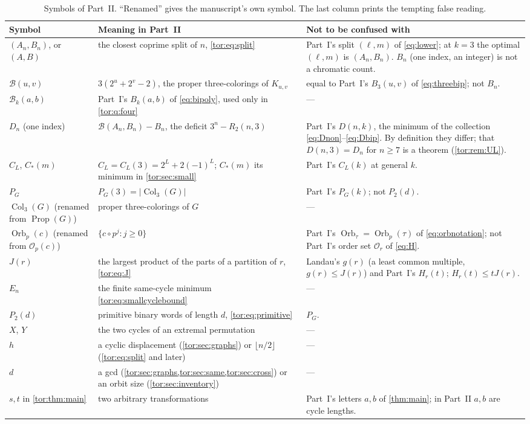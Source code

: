 \documentclass[11pt,a4paper]{article}
\numberwithin{equation}{section}
\theoremstyle{definition}
\theoremstyle{remark}
\newcommand{\Orb}{\operatorname{Orb}}
\newcommand{\Bip}{\mathcal B}
\begin{document}
\begin{table}[htbp]
\centering\small
\caption{Symbols of Part~II. ``Renamed'' gives the manuscript's own symbol.
The last column prints the tempting false reading.}
\label{tor:tab:notation}
\begin{tabular}{>{\raggedright}p{.20\linewidth}>{\raggedright}p{.36\linewidth}>{\raggedright\arraybackslash}p{.36\linewidth}}
\toprule
Symbol & Meaning in Part~II & Not to be confused with\\
\midrule
$(A_n,B_n)$, or $(A,B)$ & the closest coprime split of $n$,
 \eqref{tor:eq:split} & Part~I's split $(\ell,m)$ of \eqref{eq:lower}; at
 $k=3$ the optimal $(\ell,m)$ is $(A_n,B_n)$. $B_n$ (one index, an integer) is
 not a chromatic count.\\
$\Bip(u,v)$ & $3(2^u+2^v-2)$, the proper three-colorings of $K_{u,v}$ &
 equal to Part~I's $B_3(u,v)$ of \eqref{eq:threebip}; not $B_n$.\\
$\Bip_k(a,b)$ & Part~I's $B_k(a,b)$ of \eqref{eq:bipoly}, used only in
 \cref{tor:q:four} & ---\\
$D_n$ (one index) & $\Bip(A_n,B_n)-B_n$, the deficit $3^n-R_2(n,3)$ &
 Part~I's $D(n,k)$, the minimum of the collection
 \eqref{eq:Dnon}--\eqref{eq:Dbip}. By definition they differ; that
 $D(n,3)=D_n$ for $n\ge7$ is a theorem (\cref{tor:rem:UL}).\\
$C_L$, $C_*(m)$ & $C_L=C_L(3)=2^L+2(-1)^L$; $C_*(m)$ its minimum in
 \cref{tor:sec:small} & Part~I's $C_L(k)$ at general $k$.\\
$P_G$ & $P_G(3)=|\operatorname{Col}_3(G)|$ & Part~I's $P_G(k)$; not
 $P_2(d)$.\\
$\operatorname{Col}_3(G)$ (renamed from $\operatorname{Prop}(G)$) & proper
 three-colorings of $G$ & ---\\
$\Orb_p(c)$ (renamed from $\mathcal O_p(c)$) & $\{c\circ p^j:j\ge0\}$ &
 Part~I's $\Orb_\tau=\Orb_p(\tau)$ of \eqref{eq:orbnotation}; not Part~I's
 order set $\mathcal O_r$ of \eqref{eq:H}.\\
$J(r)$ & the largest product of the parts of a partition of $r$,
 \eqref{tor:eq:J} & Landau's $g(r)$ (a least common multiple, $g(r)\le J(r)$)
 and Part~I's $H_r(t)$; $H_r(t)\le tJ(r)$.\\
$E_n$ & the finite same-cycle minimum \eqref{tor:eq:smallcyclebound} & ---\\
$P_2(d)$ & primitive binary words of length $d$, \eqref{tor:eq:primitive} &
 $P_G$.\\
$X$, $Y$ & the two cycles of an extremal permutation & ---\\
$h$ & a cyclic displacement (\cref{tor:sec:graphs}) or $\lfloor n/2\rfloor$
 (\eqref{tor:eq:split} and later) & ---\\
$d$ & a gcd (\cref{tor:sec:graphs,tor:sec:same,tor:sec:cross}) or an orbit
 size (\cref{tor:sec:inventory}) & ---\\
$s,t$ in \cref{tor:thm:main} & two arbitrary transformations & Part~I's
 letters $a,b$ of \cref{thm:main}; in Part~II $a,b$ are cycle lengths.\\
\bottomrule
\end{tabular}
\end{table}
\end{document}
